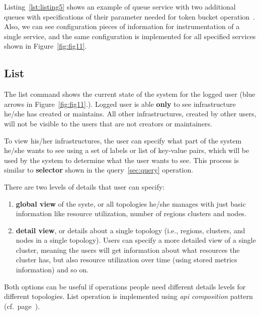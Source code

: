 Listing~\ref{lst:listing5} shows an example of queue service with two additional queues with specifications of their parameter needed for token bucket operation~\cite{MathewsKG17}. Also, we can see configuration pieces of information for instrumentation of a single service, and the same configuration is implemented for all specified services shown in Figure~\ref{fig:fig11}.


%
%
\subsection{List}\label{sec:list} 
% 
The list command shows the current state of the system for the logged user (blue arrows in Figure~\ref{fig:fig11}.). Logged user is able \textbf{only} to see infrastructure he/she has created or maintains. All other infrastructures, created by other users, will not be visible to the users that are not creators or maintainers.

To view his/her infrastructures, the user can specify what part of the system he/she wants to see using a set of labels or list of key-value pairs, which will be used by the system to determine what the user wants to see. This process is similar to \textbf{selector} shown in the query~\ref{sec:query} operation. 

There are two levels of details that user can specify:

\begin{enumerate}[start=1,label={(\bfseries \arabic*)}]
	\item \textbf{global view}  of the syste, or all topologies he/she manages with just basic information like resource utilization, number of regions clusters and nodes.
	\item \textbf{detail view}, or details about a single topology (i.e., regions, clusters, and nodes in a single topology). Users can specify a more detailed view of a single cluster, meaning the users will get information about what resources the cluster has, but also resource utilization over time (using stored metrics information) and so on.
\end{enumerate}

\noindent
Both options can be useful if operations people need different details levels for different topologies. List operation is implemented using \emph{api composition} pattern (cf.~page~\pageref{par:composition}).
%
%
